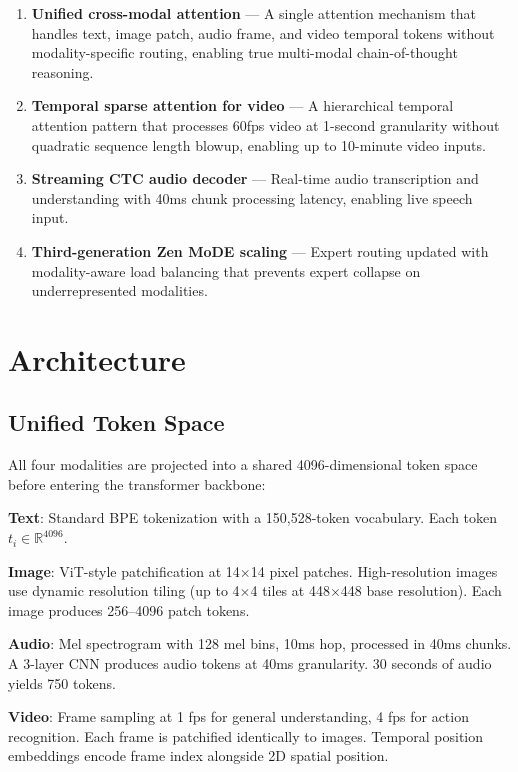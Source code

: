\documentclass[11pt,a4paper]{article}
\begin{document}
\begin{enumerate}
\item \textbf{Unified cross-modal attention} --- A single attention mechanism that handles
      text, image patch, audio frame, and video temporal tokens without modality-specific
      routing, enabling true multi-modal chain-of-thought reasoning.
\item \textbf{Temporal sparse attention for video} --- A hierarchical temporal attention
      pattern that processes 60fps video at 1-second granularity without quadratic
      sequence length blowup, enabling up to 10-minute video inputs.
\item \textbf{Streaming CTC audio decoder} --- Real-time audio transcription and
      understanding with 40ms chunk processing latency, enabling live speech input.
\item \textbf{Third-generation Zen MoDE scaling} --- Expert routing updated with
      modality-aware load balancing that prevents expert collapse on underrepresented
      modalities.
\end{enumerate}

\section{Architecture}
\label{sec:arch}

\subsection{Unified Token Space}

All four modalities are projected into a shared 4096-dimensional token space before
entering the transformer backbone:

\textbf{Text}: Standard BPE tokenization with a 150,528-token vocabulary. Each token
$t_i \in \mathbb{R}^{4096}$.

\textbf{Image}: ViT-style patchification at 14$\times$14 pixel patches. High-resolution
images use dynamic resolution tiling (up to 4$\times$4 tiles at 448$\times$448 base
resolution). Each image produces 256--4096 patch tokens.

\textbf{Audio}: Mel spectrogram with 128 mel bins, 10ms hop, processed in 40ms chunks.
A 3-layer CNN produces audio tokens at 40ms granularity. 30 seconds of audio yields
750 tokens.

\textbf{Video}: Frame sampling at 1 fps for general understanding, 4 fps for action
recognition. Each frame is patchified identically to images. Temporal position embeddings
encode frame index alongside 2D spatial position.
\end{document}
